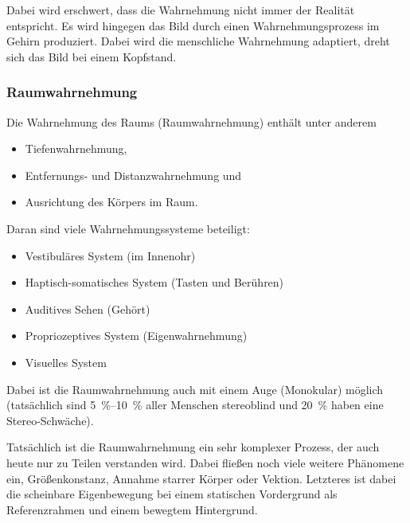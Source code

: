 			Dabei wird erschwert, dass die Wahrnehmung nicht immer der Realität entspricht. Es wird hingegen das Bild durch einen Wahrnehmungsprozess im Gehirn produziert. Dabei wird die menschliche Wahrnehmung adaptiert, \bspw dreht sich das Bild bei einem Kopfstand.

			\subsubsection{Raumwahrnehmung}
				Die Wahrnehmung des Raums (Raumwahrnehmung) enthält unter anderem
				\begin{itemize}
					\item Tiefenwahrnehmung,
					\item Entfernungs- und Distanzwahrnehmung und
					\item Ausrichtung des Körpers im Raum.
				\end{itemize}
				Daran sind viele Wahrnehmungssysteme beteiligt:
				\begin{itemize}
					\item Vestibuläres System (im Innenohr)
					\item Haptisch-somatisches System (Tasten und Berühren)
					\item Auditives Sehen (Gehört)
					\item Propriozeptives System (Eigenwahrnehmung)
					\item Visuelles System
				\end{itemize}
			
				Dabei ist die Raumwahrnehmung auch mit einem Auge (Monokular) möglich (tatsächlich sind \SIrange{5}{10}{\percent} aller Menschen stereoblind und \SI{20}{\percent} haben eine Stereo-Schwäche).
				
				Tatsächlich ist die Raumwahrnehmung ein sehr komplexer Prozess, der auch heute nur zu Teilen verstanden wird. Dabei fließen noch viele weitere Phänomene ein, \zB Größenkonstanz, Annahme starrer Körper oder Vektion. Letzteres ist dabei die scheinbare Eigenbewegung bei einem statischen Vordergrund als Referenzrahmen und einem bewegtem Hintergrund.


